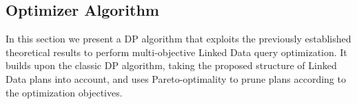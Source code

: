 
\subsection{Optimizer Algorithm}

In this section we present a DP algorithm that exploits the previously
established theoretical results to perform multi-objective Linked Data
query optimization. It builds upon the classic DP algorithm, taking
the proposed structure of Linked Data plans into account, and uses
Pareto-optimality to prune plans according to the optimization
objectives.





